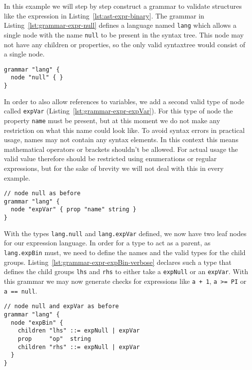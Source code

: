 \documentclass[sigconf,natbib=false]{acmart}
\begin{document}
In this example we will step by step construct a grammar to validate structures like the expression in Listing~\ref{lst:ast-expr-binary}. The grammar in Listing~\ref{lst:grammar-expr-null} defines a language named \texttt{lang} which allows a single node with the name \texttt{null} to be present in the syntax tree. This node may not have any children or properties, so the only valid syntaxtree would consist of a single node.

\begin{lstlisting}[caption={Grammar for expression \texttt{null}}, label=lst:grammar-expr-null]
grammar "lang" {
  node "null" { }
}
\end{lstlisting}

In order to also allow references to variables, we add a second valid type of node called \texttt{expVar} (Listing~\ref{lst:grammar-expr-expVar}). For this type of node the property \texttt{name} must be present, but at this moment we do not make any restriction on what this name could look like. To avoid syntax errors in practical usage, names may not contain any syntax elements. In this context this means mathematical operators or brackets shouldn't be allowed. For actual usage the valid value therefore should be restricted using enumerations or regular expressions, but for the sake of brevity we will not deal with this in every example.

\begin{lstlisting}[float,floatplacement=H,caption={Grammar for expression \texttt{expVar}}, label=lst:grammar-expr-expVar]
// node null as before
grammar "lang" {
  node "expVar" { prop "name" string }
}
\end{lstlisting}

With the types \texttt{lang.null} and \texttt{lang.expVar} defined, we now have two leaf nodes for our expression language. In order for a type to act as a parent, as \texttt{lang.expBin} must, we need to define the names and the valid types for the child groups. Listing~\ref{lst:grammar-expr-expBin-verbose} declares such a type that defines the child groups \texttt{lhs} and \texttt{rhs} to either take a \texttt{expNull} or an \texttt{expVar}. With this grammar we may now generate checks for expressions like \texttt{a + 1}, \texttt{a >= PI} or \texttt{a == null}.

\begin{lstlisting}[caption={Grammar for expression \texttt{expBin}}, label=lst:grammar-expr-expBin-verbose]
// node null and expVar as before
grammar "lang" {
  node "expBin" {
    children "lhs" ::= expNull | expVar
    prop     "op"  string
    children "rhs" ::= expNull | expVar
  }
}
\end{lstlisting}
\end{document}
